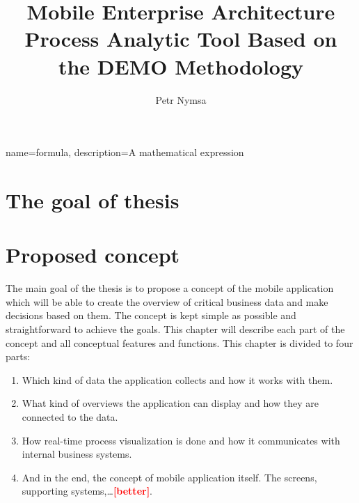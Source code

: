 \documentclass[thesis=B,english]{FITthesis}[2012/06/26]
\title{Mobile Enterprise Architecture Process Analytic Tool Based on the DEMO Methodology}
\author{Petr Nymsa} %
\newcommand{\todo}[1]{\textcolor{red}{\textbf{[#1]}}}
\begin{document}

{
        name=formula,
        description={A mathematical expression}
}




\begin{introduction}
	    
\end{introduction}

\chapter{The goal of thesis}



\chapter{Proposed concept}
The main goal of the thesis is to propose a concept of the mobile application which will be able to create the overview of critical business data and make decisions based on them. The concept is kept simple as possible and straightforward to achieve the goals. This chapter will describe each part of the concept and all conceptual features and functions. This chapter is divided to four parts:	
    \begin{enumerate}
      \item Which kind of data the application collects and how it works with them.
      \item What kind of overviews the application can display and how they are connected to the data.
      \item How real-time process visualization is done and how it communicates with internal business systems.
      \item And in the end, the concept of mobile application itself. The screens, supporting systems,\dots \todo{better}.
    \end{enumerate}
    
\end{document}
